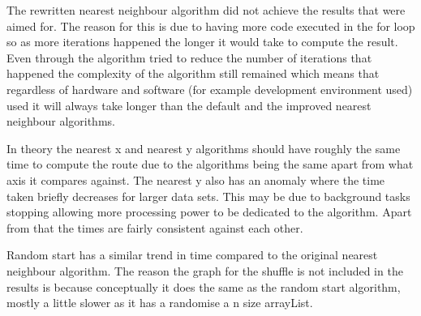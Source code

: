 \documentclass[conference,backref=page]{acmsiggraph}
\begin{document}
The rewritten nearest neighbour algorithm did not achieve the results that were aimed for. The reason for this is due to having more code executed in the for loop so as more iterations happened the longer it would take to compute the result. Even through the algorithm tried to reduce the number of iterations that happened the complexity of the algorithm still remained which means that regardless of hardware and software (for example development environment used) used it will always take longer than the default and the improved nearest neighbour algorithms.



In theory the nearest x and nearest y algorithms should have roughly the same time to compute the route due to the algorithms being the same apart from what axis it compares against. The nearest y also has an anomaly where the time taken briefly decreases for larger data sets. This may be due to background tasks stopping allowing more processing power to be dedicated to the algorithm. Apart from that the times are fairly consistent against each other. 




Random start has a similar trend in time compared to the original nearest neighbour algorithm. The reason the graph for the shuffle is not included in the results is because conceptually it does the same as the random start algorithm, mostly a little slower as it has a randomise a n size arrayList. 
\end{document}
